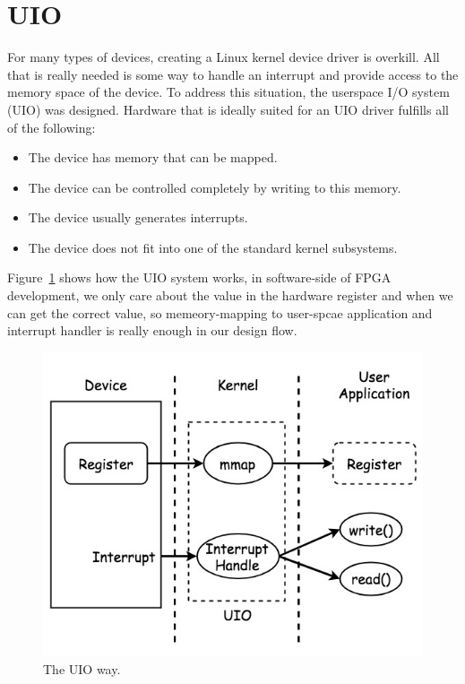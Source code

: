\section{UIO}
\label{sec:UIO}
For many types of devices, creating a Linux kernel device driver is overkill. All that is really needed 
is some way to handle an interrupt and provide access to the memory space of the device. To address 
this situation, the userspace I/O system (UIO) was designed. Hardware that is ideally suited for an 
UIO driver fulfills all of the following:
%
\begin{itemize}
\item The device has memory that can be mapped.
\item The device can be controlled completely by writing to this memory.
\item The device usually generates interrupts.
\item The device does not fit into one of the standard kernel subsystems.
\end{itemize}
%
Figure~\ref{fig:UIO Driver} shows how the UIO system works, in software-side of FPGA development, we 
only care about the value in the hardware register and when we can get the correct value, so memeory-mapping 
to user-spcae application and interrupt handler is really enough in our design flow\cite{howtoUIO}.  
%
\begin{figure}[!htb]
  \centering
  \includegraphics[scale=0.5]{images/uio.jpg}
  \caption[The UIO way.]{The UIO way.}
  \label{fig:UIO Driver}
\end{figure}

